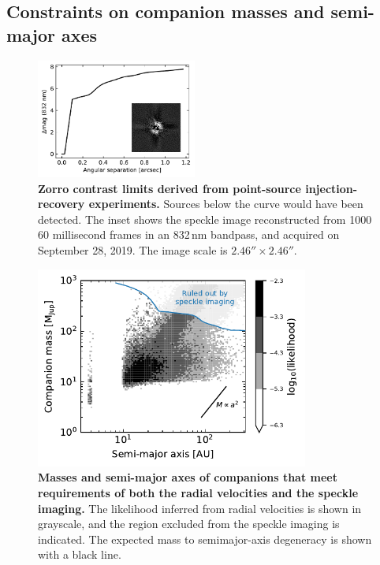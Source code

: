 \documentclass[12pt,twocolumn,tighten]{aastex62}
\begin{document}
\subsection{Constraints on companion masses and semi-major axes}

\begin{figure}[!t]
	\begin{center}
		\leavevmode
		\includegraphics[width=0.47\textwidth]{f3.pdf}
	\end{center}
	\vspace{-0.7cm}
    \caption{
      {\bf Zorro contrast limits derived from point-source
      injection-recovery experiments.} Sources below the curve would
      have been detected.  The inset shows the speckle image
      reconstructed from 1000 60 millisecond frames in an 832$\,$nm
      bandpass, and acquired on September 28, 2019.  The image scale
      is $2.46''\times2.46''$.
    }
    \label{fig:zorro}
\end{figure}

\begin{figure}[t]
	\begin{center}
		\leavevmode
		\includegraphics[width=0.8\textwidth]{f4.pdf}
	\end{center}
	\vspace{-0.8cm}
	\caption{
    {\bf Masses and semi-major axes of companions that meet
    requirements of both the radial velocities and the speckle
    imaging.} The likelihood inferred from radial velocities is shown
    in grayscale, and the region excluded from the speckle imaging is
    indicated.  The expected mass to semimajor-axis degeneracy is
    shown with a black line.
	\label{fig:mass_sma}
  \vspace{-0cm}
	}
\end{figure}
\end{document}
